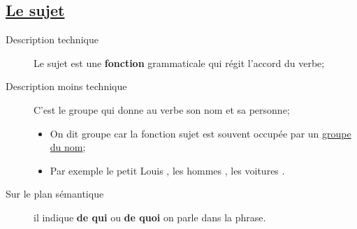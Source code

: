 \documentclass[10pt, french]{article}
\begin{document}
\begin{multicols*}{2}
\subsection*{\href{http://www.alloprof.qc.ca/BV/Pages/f1130.aspx}{Le sujet}}
\begin{description}
	\item[Description technique]	Le sujet est une \textbf{fonction} grammaticale qui régit l'accord du verbe;
	\item[Description moins technique]	C'est le \og groupe \fg{} qui donne au verbe son nom et sa personne;
		\begin{itemize}[leftmargin = *]
		\item	On dit \og groupe \fg{} car la fonction sujet est souvent occupée par un \href{http://www.alloprof.qc.ca/BV/pages/f1235.aspx}{groupe du nom};
		\item	Par exemple \og le petit Louis \fg{}, \og les hommes \fg{}, \og les voitures \fg{}.
		\end{itemize}
	\item[Sur le plan sémantique]	il indique \textbf{de qui} ou \textbf{de quoi} on parle dans la phrase.
\end{description}


\end{multicols*}
\end{document}
